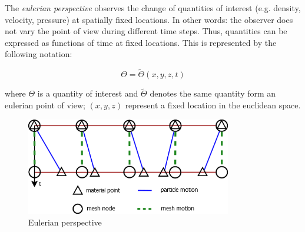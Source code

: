 The \textit{eulerian perspective} observes the change of quantities of interest (e.g. density, velocity, pressure) at spatially fixed locations. In other words: the observer does not vary the point of view during different time steps. Thus, quantities can be expressed as functions of time at fixed locations. 
This is represented by the following notation:

\begin{equation}
	\Theta = \tilde{\Theta}(x,y,z,t)
\end{equation}

where $\Theta$ is a quantity of interest and $\tilde{\Theta}$ denotes the same quantity form an eulerian point of view; $(x, y, z)$ represent a fixed location in the euclidean space.


\begin{figure}[htbp!]
	\centering
	\includegraphics[width=0.8\textwidth]{images/eulerian}
	\caption{Eulerian perspective}
	\label{fig:eulerian}
\end{figure}

